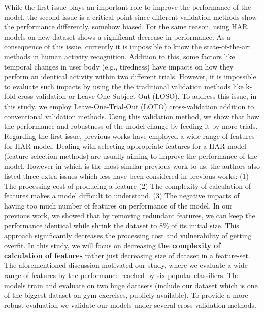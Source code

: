 \documentclass[journal,article,submit,moreauthors,pdftex]{Definitions/mdpi}
\begin{document}
%
While the first issue plays an important role to improve the performance of the model, the second issue is a critical point since different validation methods show the performance differently, somehow biased. For the same reason, using HAR models on new dataset shows a significant decrease in performance. As a consequence of this issue, currently it is impossible to know the state-of-the-art methods in human activity recognition\cite{jordao2018human}. Addition to this, some factors like temporal changes in user body (e.g., tiredness) have impacts on how they perform an identical activity within two different trials. However, it is impossible to evaluate such impacts by using the the traditional validation methods like k-fold cross-validation or Leave-One-Subject-Out (LOSO). To address this issue, in this study, we employ Leave-One-Trial-Out (LOTO) cross-validation addition to conventional validation methods. Using this validation method, we show that how the performance and robustness of the model change by feeding it by more trials.\\
Regarding the first issue, previous works have employed a wide range of features for HAR model. Dealing with selecting appropriate features for a HAR model (feature selection methods) are usually aiming to improve the performance of the model. However in \cite{rosati2018comparison} which is the most similar previous work to us, the authors also listed three extra issues which less have been considered in previous works:
(1) The processing cost of producing a feature
(2) The complexity of calculation of features makes a model difficult to understand.
(3) The negative impacts of having too much number of features on performance of the model.
In our previous work\cite{Nourani_CoMoRea2019}, we showed that by removing redundant features, we can keep the performance identical while shrink the dataset to 8\% of its initial size. This approach significantly decreases the processing cost and vulnerability of getting overfit. In this study, we will focus on decreasing \textbf{the complexity of calculation of features} rather just decreasing size of dataset in a feature-set.\\

The aforementioned discussion motivated our study, where we evaluate a wide range of features by the performance reached by six popular classifiers. The models train and evaluate on two huge datasets (include our dataset which is one of the biggest dataset on gym exercises, publicly available). To provide a more robust evaluation we validate our models under several cross-validation methods.
\end{document}
